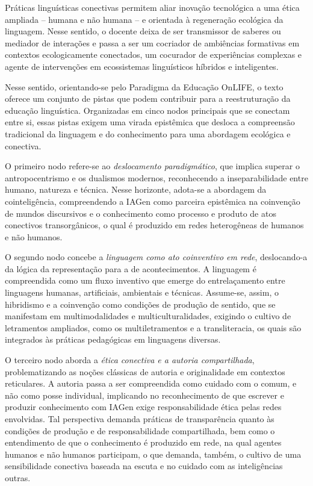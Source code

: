\documentclass[portuguese]{textolivre}
\begin{document}
Práticas linguísticas conectivas permitem aliar inovação tecnológica a uma ética ampliada – humana e não humana \cite{schlemmerdifelice2024etica} – e orientada à regeneração ecológica da linguagem. Nesse sentido, o docente deixa de ser transmissor de saberes ou mediador de interações e passa a ser um cocriador de ambiências formativas em contextos ecologicamente conectados, um cocurador de experiências complexas e agente de intervenções em ecossistemas linguísticos híbridos e inteligentes.

Nesse sentido, orientando-se pelo Paradigma da Educação OnLIFE, o texto oferece um conjunto de pistas que podem contribuir para a reestruturação da educação linguística. Organizadas em cinco nodos principais que se conectam entre si, essas pistas exigem uma virada epistêmica que desloca a compreensão tradicional da linguagem e do conhecimento para uma abordagem ecológica e conectiva.

O primeiro nodo refere-se ao \textit{deslocamento paradigmático}, que implica superar o antropocentrismo e os dualismos modernos, reconhecendo a inseparabilidade entre humano, natureza e técnica. Nesse horizonte, adota-se a abordagem da cointeligência, compreendendo a IAGen como parceira epistêmica na coinvenção de mundos discursivos e o conhecimento como processo e produto de atos conectivos transorgânicos, o qual é produzido em redes heterogêneas de humanos e não humanos.

O segundo nodo concebe a \textit{linguagem como ato coinventivo em rede}, deslocando-a da lógica da representação para a de acontecimentos. A linguagem é compreendida como um fluxo inventivo que emerge do entrelaçamento entre linguagens humanas, artificiais, ambientais e técnicas. Assume-se, assim, o hibridismo e a coinvenção como condições de produção de sentido, que se manifestam em multimodalidades e multiculturalidades, exigindo o cultivo de letramentos ampliados, como os multiletramentos e a transliteracia, os quais são integrados às práticas pedagógicas em linguagens diversas.

O terceiro nodo aborda a \textit{ética conectiva e a autoria compartilhada}, problematizando as noções clássicas de autoria e originalidade em contextos reticulares. A autoria passa a ser compreendida como cuidado com o comum, e não como posse individual, implicando no reconhecimento de que escrever e produzir conhecimento com IAGen exige responsabilidade ética pelas redes envolvidas. Tal perspectiva demanda práticas de transparência quanto às condições de produção e de responsabilidade compartilhada, bem como o entendimento de que o conhecimento é produzido em rede, na qual agentes humanos e não humanos participam, o que demanda, também, o cultivo de uma sensibilidade conectiva baseada na escuta e no cuidado com as inteligências outras.
\end{document}
